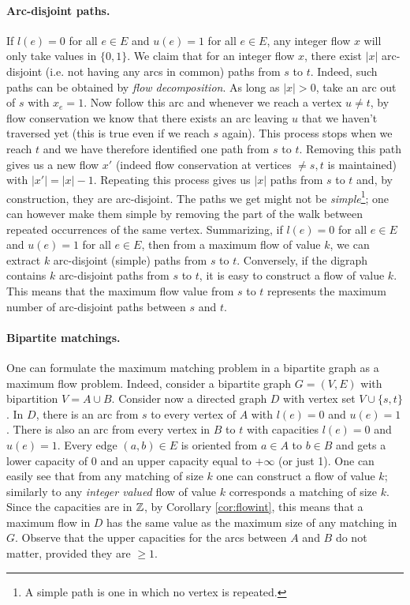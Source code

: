 \documentclass[12pt]{article}
\begin{document}
\paragraph{Arc-disjoint paths.} 
If $l(e)=0$ for all $e\in E$ and $u(e)=1$ for all $e\in E$, any
integer flow $x$ will only take values in $\{0,1\}$. We claim that for
an integer flow $x$, there exist $|x|$ arc-disjoint (i.e. not having
any arcs in common) paths from $s$ to $t$. Indeed, such paths can be
obtained by {\it flow decomposition}. As long as $|x|>0$, take an arc
out of $s$ with $x_e=1$. Now follow this arc and whenever we reach a
vertex $u\neq t$, by flow conservation we know that there exists an
arc leaving $u$ that we haven't traversed yet (this is true even if we
reach $s$ again). This process stops when we reach $t$ and we have
therefore identified one path from $s$ to $t$. Removing this path
gives us a new flow $x'$ (indeed flow conservation at vertices $\neq
s,t$ is maintained) with $|x'|=|x|-1$. Repeating this process gives us
$|x|$ paths from $s$ to $t$ and, by construction, they are
arc-disjoint. The paths we get might not be {\it simple}\footnote{A
  simple path is one in which no vertex is repeated.}; one can however
make them simple by removing the part of the walk between repeated
occurrences of the same vertex.  Summarizing, if $l(e)=0$ for all $e\in
E$ and $u(e)=1$ for all $e\in E$, then from a maximum flow of value
$k$, we can extract $k$ arc-disjoint (simple) paths from $s$
to $t$. Conversely, if the digraph contains $k$ arc-disjoint paths
from $s$ to $t$, it is easy to construct a flow of value $k$. This
means that the maximum flow value from $s$ to $t$ represents the
maximum number of arc-disjoint paths between $s$ and $t$. 

\paragraph{Bipartite matchings.} One can formulate the maximum
 matching problem in a bipartite graph as a maximum flow
 problem. Indeed, consider a bipartite graph $G=(V,E)$ with
 bipartition $V=A\cup B$. Consider now a directed graph $D$ with vertex
 set $V\cup \{s,t\}$. In $D$, there is an arc from $s$ to every vertex
 of $A$ with $l(e)=0$ and $u(e)=1$. There is also an arc from every
 vertex in $B$ to $t$ with capacities $l(e)=0$ and $u(e)=1$. Every
 edge $(a,b)\in E$ is oriented from $a\in A$ to $b\in B$ and gets a
 lower capacity of 0 and an upper capacity equal to $+\infty$ (or just
 1). One can easily see that from any matching of size $k$ one can
 construct a flow of value $k$; similarly to any {\it integer
 valued} flow of value $k$ corresponds a matching of size $k$. Since
 the capacities are in ${\mathbb Z}$, by Corollary \ref{cor:flowint}, this
 means that a maximum flow in $D$ has the same value as the maximum
 size of any matching in $G$. Observe that the upper capacities for
 the arcs between $A$ and $B$ do not matter, provided they are $\geq
 1$. 
\end{document}
